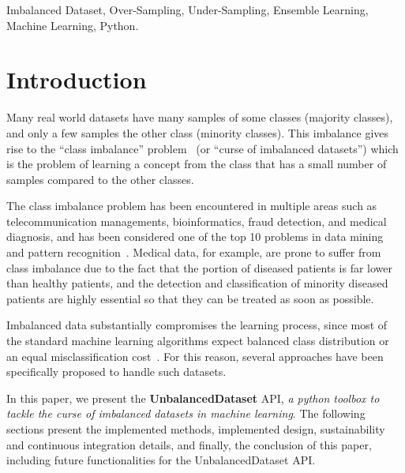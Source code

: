 \documentclass[twoside,11pt]{article}
\begin{document}
\begin{keywords}
Imbalanced Dataset, Over-Sampling, Under-Sampling, Ensemble Learning, Machine Learning, Python.
\end{keywords}

\section{Introduction}

Many real world datasets have many samples of some classes (majority classes),
and only a few samples the other class (minority classes). This imbalance gives
rise to the ``class imbalance'' problem~\cite{prati2009data} (or ``curse of imbalanced datasets'')
which is the problem of learning a concept from the class that has a small number of samples compared
to the other classes. 

The class imbalance problem has been encountered in multiple areas such as 
telecommunication managements, bioinformatics, fraud detection, and medical diagnosis,
and has been considered one of the top 10 problems in data mining and 
pattern recognition~\cite{10problemsInDM:2006}. 
Medical data, for example, are prone to suffer from class imbalance due to the fact 
that the portion of diseased patients is far lower than healthy patients,
and the detection and classification of minority diseased patients are highly essential
so that they can be treated as soon as possible.

Imbalanced data substantially compromises the learning process, since most of the 
standard machine learning algorithms expect balanced class distribution or an 
equal misclassification cost~\cite{he2009learning}. For this reason, several
approaches have been specifically proposed to handle such datasets.

In this paper, we present the \textbf{UnbalancedDataset} API, 
\textit{a python toolbox to tackle the curse of imbalanced datasets
in machine learning}. The following sections present the implemented
methods, implemented design, sustainability and continuous integration details,
and finally, the conclusion of this paper, including future functionalities
for the UnbalancedDataset API.

\end{document}
